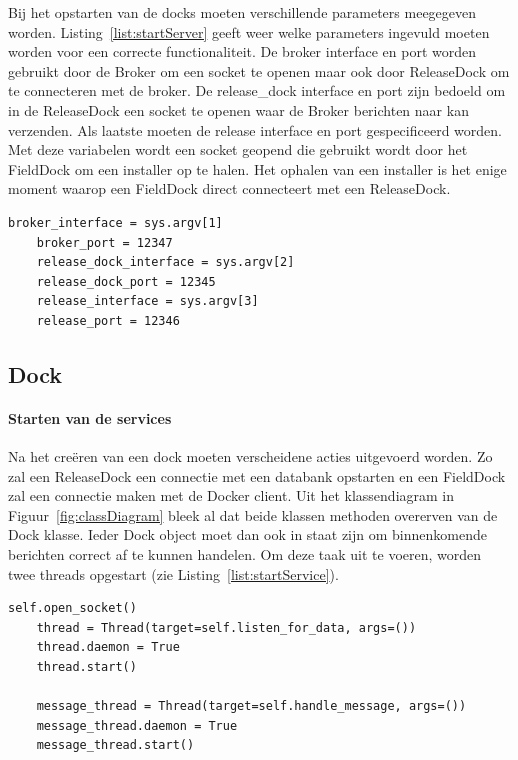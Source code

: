 Bij het opstarten van de docks moeten verschillende parameters meegegeven worden.
Listing~\ref{list:startServer} geeft weer welke parameters ingevuld moeten worden voor een correcte functionaliteit.
De broker interface en port worden gebruikt door de Broker om een socket te openen maar ook door ReleaseDock om te connecteren met de broker.
De release\_dock interface en port zijn bedoeld om in de ReleaseDock een socket te openen waar de Broker berichten naar kan verzenden.
Als laatste moeten de release interface en port gespecificeerd worden.
Met deze variabelen wordt een socket geopend die gebruikt wordt door het FieldDock om een installer op te halen.
Het ophalen van een installer is het enige moment waarop een FieldDock direct connecteert met een ReleaseDock.			

\begin{minipage}{\linewidth}
\begin{center}
\begin{lstlisting}[captionpos=b,caption={Parameters voor server en broker},label={list:startServer}]
    broker_interface = sys.argv[1]
    broker_port = 12347
    release_dock_interface = sys.argv[2]
    release_dock_port = 12345
    release_interface = sys.argv[3]
    release_port = 12346
\end{lstlisting}
\end{center}
\end{minipage}

\subsection{Dock}
\paragraph{Starten van de services} %
Na het creëren van een dock moeten verscheidene acties uitgevoerd worden.
Zo zal een ReleaseDock een connectie met een databank opstarten en een FieldDock zal een connectie maken met de Docker client.
Uit het klassendiagram in Figuur~\ref{fig:classDiagram} bleek al dat beide klassen methoden overerven van de Dock klasse.
Ieder Dock object moet dan ook in staat zijn om binnenkomende berichten correct af te kunnen handelen.
Om deze taak uit te voeren, worden twee threads opgestart (zie Listing~\vref{list:startService}).

\begin{minipage}{\linewidth}
\begin{center}
\begin{lstlisting}[captionpos=b,caption={Starten van dock services},label={list:startService}]
    self.open_socket()
    thread = Thread(target=self.listen_for_data, args=())
    thread.daemon = True
    thread.start()

    message_thread = Thread(target=self.handle_message, args=())
    message_thread.daemon = True
    message_thread.start()
\end{lstlisting}
\end{center}
\end{minipage}


